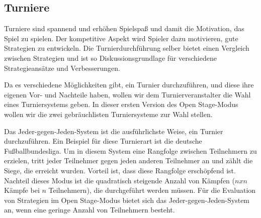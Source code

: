 \subsection{Turniere}

Turniere sind spannend und erhöhen Spielspaß und damit die Motivation, das Spiel zu spielen. Der
kompetitive Aspekt wird Spieler dazu motivieren, gute Strategien zu entwickeln. Die
Turnierdurchführung selber bietet einen Vergleich zwischen Strategien und ist so
Diskussionsgrundlage für verschiedene Strategieansätze und Verbesserungen.

Da es verschiedene Möglichkeiten gibt, ein Turnier durchzuführen, und diese ihre eigenen Vor- und
Nachteile haben, wollen wir dem Turnierveranstalter die Wahl eines Turniersystems geben. In dieser
ersten Version des Open Stage-Modus wollen wir die zwei gebräuchlisten Turniersysteme zur Wahl
stellen.

Das Jeder-gegen-Jeden-System ist die ausführlichste Weise, ein Turnier durchzuführen. Ein Beispiel
für diese Turnierart ist die deutsche Fußballbundesliga. Um in diesem System eine Rangfolge zwischen
Teilnehmern zu erzielen, tritt jeder Teilnehmer gegen jeden anderen Teilnehmer an und zählt die
Siege, die erreicht wurden. Vorteil ist, dass diese Rangfolge erschöpfend ist. Nachteil dieses
Modus ist die quadratisch steigende Anzahl von Kämpfen ($n x n$ Kämpfe bei $n$ Teilnehmern),
die durchgeführt werden müssen. Für die Evaluation von Strategien im Open Stage-Modus bietet sich das
Jeder-gegen-Jeden-System an, wenn eine geringe Anzahl von Teilnehmern besteht.


